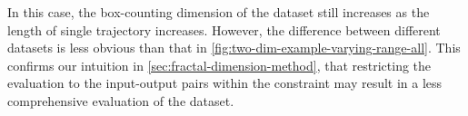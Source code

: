 In this case, the box-counting dimension of the dataset still increases as the length of single trajectory increases.
However, the difference between different datasets is less obvious than that in \cref{fig:two-dim-example-varying-range-all}.
This confirms our intuition in \cref{sec:fractal-dimension-method}, that restricting the evaluation to the input-output pairs within the constraint may result in a less comprehensive evaluation of the dataset.


